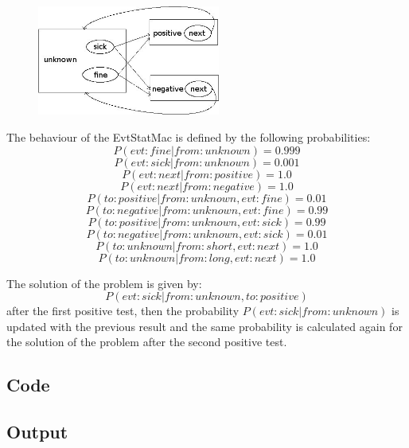 \documentclass[12pt, a4paper]{article}
\begin{document}
\begin{center}
\begin{figure}[H]
\centering
\includegraphics[width=6cm]{./ex2.jpg}
\end{figure}
\end{center}

The behaviour of the EvtStatMac is defined by the following probabilities:\\
$$P(evt:fine|from:unknown)=0.999$$
$$P(evt:sick|from:unknown)=0.001$$
$$P(evt:next|from:positive)=1.0$$
$$P(evt:next|from:negative)=1.0$$
$$P(to:positive|from:unknown,evt:fine)=0.01$$
$$P(to:negative|from:unknown,evt:fine)=0.99$$
$$P(to:positive|from:unknown,evt:sick)=0.99$$
$$P(to:negative|from:unknown,evt:sick)=0.01$$
$$P(to:unknown|from:short,evt:next)=1.0$$
$$P(to:unknown|from:long,evt:next)=1.0$$

The solution of the problem is given by: $$P(evt:sick|from:unknown,to:positive)$$ after the first positive test, then the probability $P(evt:sick|from:unknown)$ is updated with the previous result and the same probability is calculated again for the solution of the problem after the second positive test.\\

\subsection{Code}

\begin{scriptsize}
\begin{ttfamily}

\end{ttfamily}
\end{scriptsize}

\subsection{Output}
\end{document}
